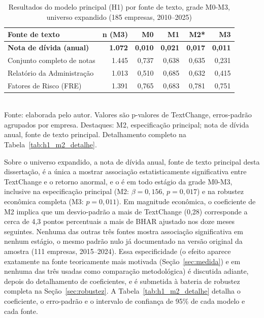 \documentclass[a4paper,12pt]{report}
\begin{document}
\begin{table}[htbp]
    \centering
    \caption{Resultados do modelo principal (H1) por fonte de texto, grade M0-M3, universo expandido (185 empresas, 2010--2025)}
    \label{tab:h1}
    \small
    \begin{tabular}{@{}lrrrrr@{}}
        \toprule
        \textbf{Fonte de texto} & \textbf{n (M3)} & \textbf{M0} & \textbf{M1} & \cellcolor{m2principal}\textbf{M2*} & \textbf{M3} \\
        \midrule
        \rowcolor{fontechave}
        \textbf{Nota de dívida (anual)}       & \textbf{1.072} & \textbf{0,010} & \textbf{0,021} & \cellcolor{m2intersecao}\textbf{0,017} & \textbf{0,011} \\
        Conjunto completo de notas   & 1.445 & 0,737 & 0,638 & \cellcolor{m2principal}0,635 & 0,231 \\
        Relatório da Administração   & 1.013 & 0,510 & 0,685 & \cellcolor{m2principal}0,632 & 0,415 \\
        Fatores de Risco (FRE)       & 1.391 & 0,765 & 0,683 & \cellcolor{m2principal}0,781 & 0,751 \\
        \bottomrule
    \end{tabular}
    \\[0.3cm]
    {\footnotesize Fonte: elaborada pelo autor. Valores são p-valores de TextChange, erros-padrão agrupados por empresa. Destaques: M2, especificação principal; nota de dívida anual, fonte de texto principal. Detalhamento completo na Tabela~\ref{tab:h1_m2_detalhe}.}
\end{table}

Sobre o universo expandido, a nota de dívida anual, fonte de texto principal desta dissertação, é a única a mostrar associação estatisticamente significativa entre TextChange e o retorno anormal, e o é em todo estágio da grade M0-M3, inclusive na especificação principal (M2: $\beta=0{,}156$, $p=0{,}017$) e na robustez econômica completa (M3: $p=0{,}011$). Em magnitude econômica, o coeficiente de M2 implica que um desvio-padrão a mais de TextChange (0,28) corresponde a cerca de 4,3 pontos percentuais a mais de BHAR ajustado nos doze meses seguintes. Nenhuma das outras três fontes mostra associação significativa em nenhum estágio, o mesmo padrão nulo já documentado na versão original da amostra (111 empresas, 2015--2024). Essa especificidade (o efeito aparece exatamente na fonte teoricamente mais motivada (Seção~\ref{sec:medida}) e em nenhuma das três usadas como comparação metodológica) é discutida adiante, depois do detalhamento de coeficientes, e é submetida à bateria de robustez completa na Seção~\ref{sec:robustez}. A Tabela~\ref{tab:h1_m2_detalhe} detalha o coeficiente, o erro-padrão e o intervalo de confiança de 95\% de cada modelo e cada fonte.
\end{document}
